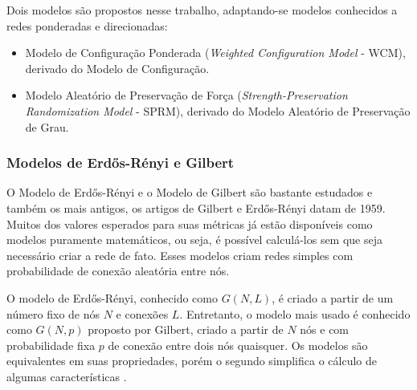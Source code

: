 \documentclass[12pt,a4paper]{article}
\theoremstyle{hypo}
\begin{document}
Dois modelos são propostos nesse trabalho, adaptando-se modelos conhecidos a redes ponderadas e direcionadas:
\begin{itemize}
\item Modelo de Configuração Ponderada (\textit{Weighted Configuration Model} - WCM), derivado do Modelo de Configuração.
\item Modelo Aleatório de Preservação de Força (\textit{Strength-Preservation Randomization Model} - SPRM), derivado do Modelo Aleatório de Preservação de Grau.
\end{itemize}


\subsubsection{Modelos de Erdős-Rényi e Gilbert}

O Modelo de Erdős-Rényi e o Modelo de Gilbert são bastante estudados e também os mais antigos, os artigos de Gilbert e Erdős-Rényi datam de 1959. Muitos dos valores esperados para suas métricas já estão disponíveis como modelos puramente matemáticos, ou seja, é possível calculá-los sem que seja necessário criar a rede de fato. Esses modelos criam redes simples com probabilidade de conexão aleatória entre nós.

O modelo de Erdős-Rényi, conhecido como $G(N,L)$, é criado a partir de um número fixo de nós $N$ e conexões $L$. Entretanto, o modelo mais usado é conhecido como $G(N,p)$ proposto por Gilbert, criado a partir de $N$ nós e com probabilidade fixa $p$ de conexão entre dois nós quaisquer. Os modelos são equivalentes em suas propriedades, porém o segundo simplifica o cálculo de algumas características \cite{Barabasi2016-rn}.
\end{document}
